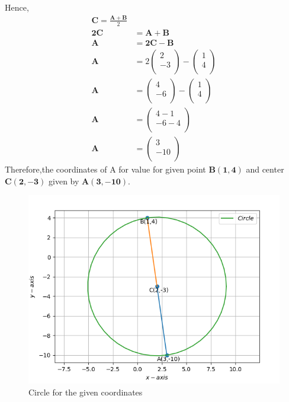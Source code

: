 \documentclass[12pt]{article}
\newcommand{\myvec}[1]{\ensuremath{\begin{pmatrix}#1\end{pmatrix}}}
\let\vec\mathbf
\begin{document}
\begin{enumerate}
Hence,	
	\begin{align}
	\vec{C} = \frac{\vec{A+B}}{2} \\
		\vec{2C} &= \vec{A}+\vec{B} \\
		\vec{A} &= \vec{2C}-\vec{B} \\
		\vec{A} &= 2\myvec{2\\-3\\}-\myvec{1\\4\\} \\
		\vec{A} &= \myvec{4\\-6\\}-\myvec{1\\4\\} \\
		\vec{A} &= \myvec{4-1\\-6-4\\} \\	
		\vec{A} &= \myvec{3\\-10\\}	
	\end{align}       
    Therefore,the coordinates of A for value for given point $\vec{B(1,4)}$ and center $\vec{C(2,-3)}$ given by $\vec{A(3,-10)}$.	
\hspace{5mm}
\begin{figure}[!h]
\begin{center}	
	\includegraphics[width=\columnwidth]{./figs/Vector1.png}
\end{center}
\caption{Circle for the given coordinates}
\label{fig:Fig}
\end{figure}
\end{enumerate}
\end{document}

